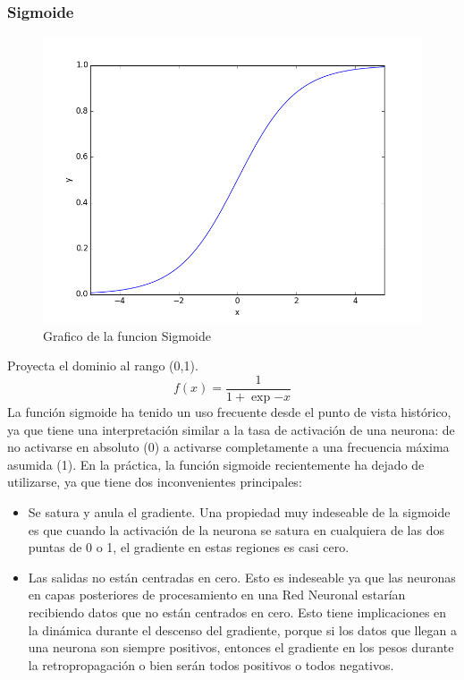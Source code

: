 \documentclass[a4paper,11pt,spanish]{book}
\begin{document}
	  \subsubsection {Sigmoide}
	    \begin{figure}[H]
	      \begin{center}
	       \includegraphics[width=0.4\linewidth]{./img/sigmoid.png}
	      \end{center}
	      \caption{Grafico de la funcion Sigmoide}
	      \label{fig:sigmoid}
	    \end{figure}
	    Proyecta el dominio al rango (0,1).
	    \begin{equation}
	     f(x) = \frac{1}{1+\exp{-x}}
	    \end{equation}
	    La función sigmoide ha tenido un uso frecuente desde el punto de vista histórico, ya que tiene una interpretación similar a la tasa de activación de una neurona:
	    de no activarse en absoluto (0) a activarse completamente a una frecuencia máxima asumida (1). En la práctica, la función sigmoide recientemente ha dejado de utilizarse,
	    ya  que tiene dos inconvenientes principales:
	    \begin{itemize}
	     \item Se satura y anula el gradiente. Una propiedad muy indeseable de la sigmoide es que cuando la activación de la neurona se satura en cualquiera de las dos puntas de 0 o 1,
	      el gradiente en estas regiones es casi cero.
	     \item Las salidas no están centradas en cero. Esto es indeseable ya que las neuronas en capas posteriores de procesamiento en una Red Neuronal estarían recibiendo
	      datos que no están centrados en cero. Esto tiene implicaciones en la dinámica durante el descenso del gradiente, porque si los datos que llegan a una neurona
	      son siempre positivos, entonces el gradiente en los pesos durante la retropropagación o bien serán todos positivos o todos negativos.
	    \end{itemize}
\end{document}
